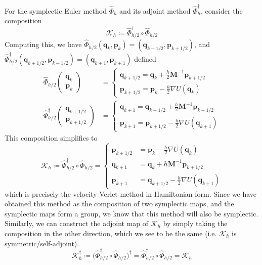       For the symplectic Euler method $\hat{\Phi}_h$ and its adjoint method $\hat{\Phi}_h^\dagger$, consider the composition 
      \begin{equation}
        \mathcal{K}_h \coloneqq \hat{\Phi}_{h/2}^\dagger \circ \hat{\Phi}_{h/2}
      \end{equation}
      Computing this, we have $\hat{\Phi}_{h/2} (\mathbf{q}_k, \mathbf{p}_k) = (\mathbf{q}_{k + 1/2}, \mathbf{p}_{k + 1/2})$, and $\hat{\Phi}_{h/2}^\dagger (\mathbf{q}_{k + 1/2}, \mathbf{p}_{k + 1/2}) = (\mathbf{q}_{k+1}, \mathbf{p}_{k+1})$ defined 
      \begin{align*}
        \hat{\Phi}_{h/2} \begin{pmatrix} \mathbf{q}_k \\ \mathbf{p}_k \end{pmatrix} & = \begin{cases} 
        \mathbf{q}_{k + 1/2} = \mathbf{q}_k + \frac{h}{2} \mathbf{M}^{-1} \mathbf{p}_{k + 1/2} \\
        \mathbf{p}_{k + 1/2} = \mathbf{p}_k - \frac{h}{2} \nabla U(\mathbf{q}_k)
        \end{cases} \\
        \hat{\Phi}_{h/2}^\dagger \begin{pmatrix} \mathbf{q}_{k+ 1/2} \\ \mathbf{p}_{k+ 1/2} \end{pmatrix} & = \begin{cases} 
        \mathbf{q}_{k+1} = \mathbf{q}_{k + 1/2} + \frac{h}{2} \mathbf{M}^{-1} \mathbf{p}_{k + 1/2} \\
        \mathbf{p}_{k+1} = \mathbf{p}_{k + 1/2} - \frac{h}{2} \nabla U (\mathbf{q}_{k+1})
        \end{cases} 
      \end{align*}
      This composition simplifies to 
      \begin{equation}
        \mathcal{K}_h \coloneqq \hat{\Phi}_{h/2}^\dagger \circ \hat{\Phi}_{h/2} = \begin{cases} 
        \mathbf{p}_{k + 1/2} & = \mathbf{p}_k - \frac{h}{2} \nabla U(\mathbf{q}_k) \\
        \mathbf{q}_{k + 1} & = \mathbf{q}_k + h \mathbf{M}^{-1} \mathbf{p}_{k + 1/2} \\
        \mathbf{p}_{k + 1} & = \mathbf{q}_{k + 1/2} - \frac{h}{2} \nabla U (\mathbf{q}_{k+1})
        \end{cases}
      \end{equation}
      which is precisely the velocity Verlet method in Hamiltonian form. Since we have obtained this method as the composition of two symplectic maps, and the symplectic maps form a group, we know that this method will also be symplectic. Similarly, we can construct the adjoint map of $\mathcal{K}_h$ by simply taking the composition in the other direction, which we see to be the same (i.e. $\mathcal{K}_h$ is symmetric/self-adjoint). 
      \begin{equation}
        \mathcal{K}_h^\dagger \coloneqq \big(\hat{\Phi}_{h/2}^\dagger \circ \hat{\Phi}_{h/2}\big)^\dagger = \hat{\Phi}_{h/2}^\dagger \circ \hat{\Phi}_{h/2} = \mathcal{K}_h
      \end{equation}

